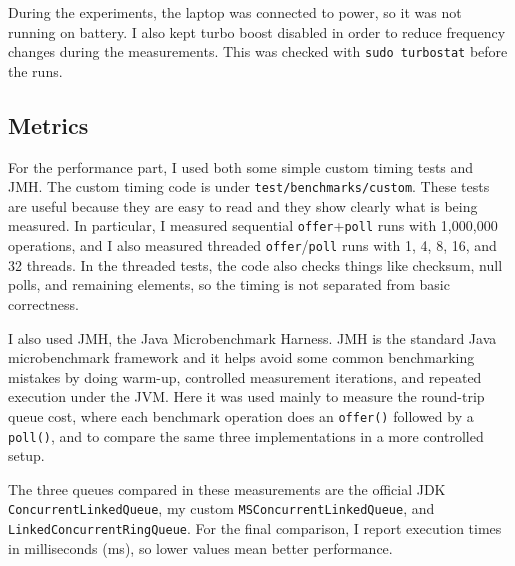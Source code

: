 During the experiments, the laptop was connected to power, so it was not running on battery. I also kept turbo boost disabled in order to reduce frequency changes during the measurements. This was checked with \texttt{sudo turbostat} before the runs.
\subsection{Metrics}
For the performance part, I used both some simple custom timing tests and JMH. The custom timing code is under \texttt{test/benchmarks/custom}. These tests are useful because they are easy to read and they show clearly what is being measured. In particular, I measured sequential \texttt{offer}+\texttt{poll} runs with 1,000,000 operations, and I also measured threaded \texttt{offer}/\texttt{poll} runs with 1, 4, 8, 16, and 32 threads. In the threaded tests, the code also checks things like checksum, null polls, and remaining elements, so the timing is not separated from basic correctness.

I also used JMH, the Java Microbenchmark Harness. JMH is the standard Java microbenchmark framework and it helps avoid some common benchmarking mistakes by doing warm-up, controlled measurement iterations, and repeated execution under the JVM. Here it was used mainly to measure the round-trip queue cost, where each benchmark operation does an \texttt{offer()} followed by a \texttt{poll()}, and to compare the same three implementations in a more controlled setup.

The three queues compared in these measurements are the official JDK \texttt{ConcurrentLinkedQueue}, my custom \texttt{MSConcurrentLinkedQueue}, and \texttt{LinkedConcurrentRingQueue}. For the final comparison, I report execution times in milliseconds (ms), so lower values mean better performance.

